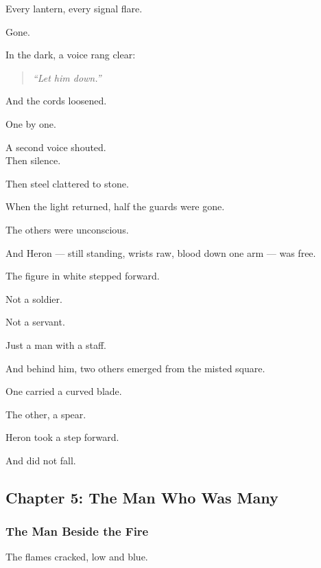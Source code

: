 \documentclass[12pt]{article}
\begin{document}
Every lantern, every signal flare.

Gone.

\vspace{1em}

In the dark, a voice rang clear:

\begin{quote}
\textit{“Let him down.”}
\end{quote}

And the cords loosened.

One by one.

A second voice shouted.\\
Then silence.

Then steel clattered to stone.

\vspace{1em}

When the light returned, half the guards were gone.

The others were unconscious.

And Heron — still standing, wrists raw, blood down one arm — was free.

\vspace{1em}

The figure in white stepped forward.

Not a soldier.

Not a servant.

Just a man with a staff.

And behind him, two others emerged from the misted square.

One carried a curved blade.

The other, a spear.

\vspace{1em}

Heron took a step forward.

And did not fall.

\newpage

\subsection{Chapter 5: The Man Who Was Many}

\vspace{.5in}

\subsubsection{The Man Beside the Fire}

The flames cracked, low and blue.
\end{document}
